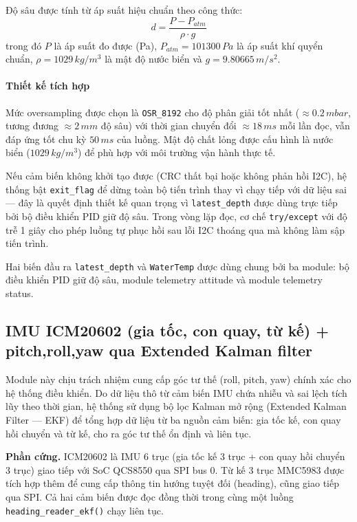 \documentclass[../DoAn.tex]{subfiles}
\begin{document}
Độ sâu được tính từ áp suất hiệu chuẩn theo công thức:
\begin{equation}
    d = \frac{P - P_{atm}}{\rho \cdot g}
\end{equation}
trong đó $P$ là áp suất đo được (Pa), $P_{atm} = 101300\,Pa$ là áp
suất khí quyển chuẩn, $\rho = 1029\,kg/m^3$ là mật độ nước biển
và $g = 9.80665\,m/s^2$.

\paragraph{Thiết kế tích hợp}

Mức oversampling được chọn là \texttt{OSR\_8192} cho độ phân giải
tốt nhất ($\approx 0.2\,mbar$, tương đương $\approx 2\,mm$ độ sâu)
với thời gian chuyển đổi $\approx 18\,ms$ mỗi lần đọc, vẫn đáp ứng
tốt chu kỳ $50\,ms$ của luồng. Mật độ chất lỏng được cấu hình là
nước biển ($1029\,kg/m^3$) để phù hợp với môi trường vận hành thực tế.

Nếu cảm biến không khởi tạo được (CRC thất bại hoặc không phản hồi
I2C), hệ thống bật \texttt{exit\_flag} để dừng toàn bộ tiến trình
thay vì chạy tiếp với dữ liệu sai --- đây là quyết định thiết kế
quan trọng vì \texttt{latest\_depth} được dùng trực tiếp bởi bộ
điều khiển PID giữ độ sâu. Trong vòng lặp đọc, cơ chế
\texttt{try/except} với độ trễ 1 giây cho phép luồng tự phục hồi
sau lỗi I2C thoáng qua mà không làm sập tiến trình.

Hai biến đầu ra \texttt{latest\_depth} và \texttt{WaterTemp} được
dùng chung bởi ba module: bộ điều khiển PID giữ độ sâu, module
telemetry attitude và module telemetry status.
\subsection{IMU ICM20602 (gia tốc, con quay, từ kế) + pitch,roll,yaw qua Extended Kalman filter}

Module này chịu trách nhiệm cung cấp góc tư thế (roll, pitch, yaw)
chính xác cho hệ thống điều khiển. Do dữ liệu thô từ cảm biến IMU
chứa nhiễu và sai lệch tích lũy theo thời gian, hệ thống sử dụng
bộ lọc Kalman mở rộng (Extended Kalman Filter --- EKF) để tổng hợp
dữ liệu từ ba nguồn cảm biến: gia tốc kế, con quay hồi chuyển và
từ kế, cho ra góc tư thế ổn định và liên tục.

\textbf{Phần cứng.}
ICM20602 là IMU 6 trục (gia tốc kế 3 trục + con quay hồi chuyển 3
trục) giao tiếp với SoC QCS8550 qua SPI bus 0. Từ kế 3 trục MMC5983
được tích hợp thêm để cung cấp thông tin hướng tuyệt đối (heading),
cũng giao tiếp qua SPI. Cả hai cảm biến được đọc đồng thời trong
cùng một luồng \texttt{heading\_reader\_ekf()} chạy liên tục.
\end{document}
